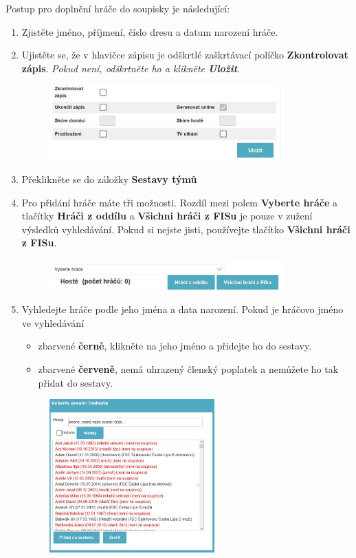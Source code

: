 \documentclass{newsletter_2025}
\begin{document}
Postup pro doplnění hráče do soupisky je následující:
\begin{enumerate}
	\item Zjistěte jméno, příjmení, číslo dresu a datum narození hráče.
	\item Ujistěte se, že v hlavičce zápisu je odškrtlé zaškrtávací políčko \textbf{Zkontrolovat zápis}.\textit{ Pokud není, odškrtněte ho a klikněte \textbf{Uložit}}.
	\begin{figure}[h]
		\centering
		\includegraphics[width=0.85\textwidth, keepaspectratio]{zkontrolovat_zapis}
	\end{figure}
	\item Překlikněte se do záložky \textbf{Sestavy týmů}
	\item Pro přidání hráče máte tři možnosti. Rozdíl mezi polem \textbf{Vyberte hráče} a tlačítky \textbf{Hráči z oddílu} a \textbf{Všichni hráči z FISu} je pouze v zužení výsledků vyhledávání. Pokud si nejste jisti, používejte tlačítko \textbf{Všichni hráči z FISu}.
	\begin{figure}[h]
		\centering
		\includegraphics[width=0.85\textwidth, keepaspectratio]{vyber_hrace_soupiska}
	\end{figure}
	\clearpage
	\item Vyhledejte hráče podle jeho jména a data narození. Pokud je hráčovo jméno ve vyhledávání
	\begin{itemize}
		\item zbarvené \textbf{černě}, klikněte na jeho jméno a přidejte ho do sestavy.
		\item zbarvené \textcolor{cfred}{\textbf{červeně}}, nemá uhrazený členský poplatek a nemůžete ho tak přidat do sestavy.
	\end{itemize}
	\begin{figure}[h]
		\centering
		\includegraphics[width=0.6\textwidth, keepaspectratio]{vyber_hrace_z_fisu}

\end{figure}
\end{enumerate}
\end{document}
